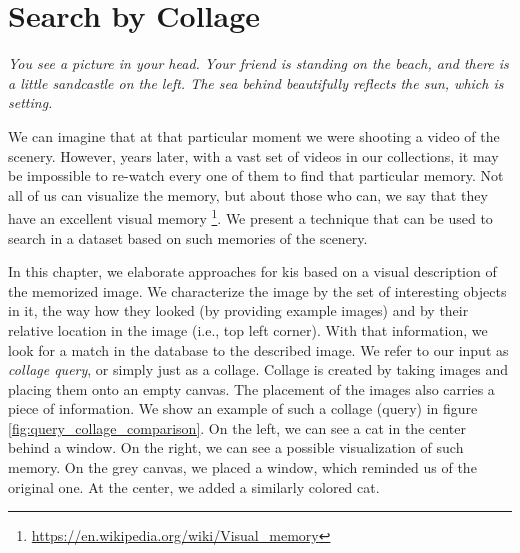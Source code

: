 
\chapter{Search by Collage}
\label{ch:object_location}


\normalem
\emph{You see a picture in your head. Your friend is standing on the beach, and there is a little sandcastle on the left. The sea behind beautifully reflects the sun, which is setting.}
\ULforem

We can imagine that at that particular moment we were shooting a video of the scenery. However, years later, with a vast set of videos in our collections, it may be impossible to re-watch every one of them to find that particular memory. Not all of us can visualize the memory, but about those who can, we say that they have an excellent visual memory \footnote{\url{https://en.wikipedia.org/wiki/Visual_memory}}. We present a technique that can be used to search in a dataset based on such memories of the scenery.

In this chapter, we elaborate approaches for \acrlong{kis} based on a visual description of the memorized image. We characterize the image by the set of interesting objects in it, the way how they looked (by providing example images) and by their relative location in the image (i.e., top left corner). With that information, we look for a match in the database to the described image. We refer to our input as \emph{collage query}, or simply just as a collage. Collage is created by taking images and placing them onto an empty canvas. The placement of the images also carries a piece of information. We show an example of such a collage (query) in figure \ref{fig:query_collage_comparison}. On the left, we can see a cat in the center behind a window. On the right, we can see a possible visualization of such memory. On the grey canvas, we placed a window, which reminded us of the original one. At the center, we added a similarly colored cat.

